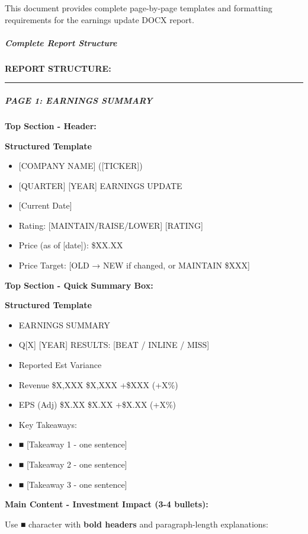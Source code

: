 \documentclass[11pt]{article}
\begin{document}
This document provides complete page-by-page templates and formatting requirements for the earnings update DOCX report.


\subparagraph{Complete Report Structure}\mbox{}\par

\textbf{REPORT STRUCTURE:}


\vspace{0.5em}\hrule\vspace{0.5em}

\subparagraph{PAGE 1: EARNINGS SUMMARY}\mbox{}\par

\textbf{Top Section - Header:}

\textbf{Structured Template}
\begin{itemize}[leftmargin=*,itemsep=2pt,topsep=2pt]
\item {} [COMPANY NAME] ([TICKER])
\item {} [QUARTER] [YEAR] EARNINGS UPDATE
\item {} [Current Date]
\item {} Rating: [MAINTAIN/RAISE/LOWER] [RATING]
\item {} Price (as of [date]): \$XX.XX
\item {} Price Target: [OLD → NEW if changed, or MAINTAIN \$XXX]
\end{itemize}

\textbf{Top Section - Quick Summary Box:}

\textbf{Structured Template}
\begin{itemize}[leftmargin=*,itemsep=2pt,topsep=2pt]
\item {} EARNINGS SUMMARY
\item {} Q[X] [YEAR] RESULTS: [BEAT / INLINE / MISS]
\item {} Reported Est Variance
\item {} Revenue \$X,XXX \$X,XXX +\$XXX (+X\%)
\item {} EPS (Adj) \$X.XX \$X.XX +\$X.XX (+X\%)
\item {} Key Takeaways:
\item {} ■ [Takeaway 1 - one sentence]
\item {} ■ [Takeaway 2 - one sentence]
\item {} ■ [Takeaway 3 - one sentence]
\end{itemize}

\textbf{Main Content - Investment Impact (3-4 bullets):}


Use ■ character with \textbf{bold headers} and paragraph-length explanations:
\end{document}
